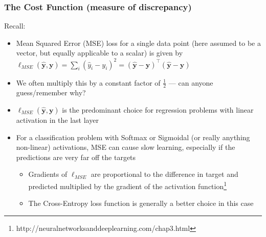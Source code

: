 \documentclass[\beamerclass]{beamer}
\begin{document}
\begin{frame}[fragile]\frametitle{The Cost Function (measure of discrepancy) }

Recall:

\begin{itemize}
\item Mean Squared Error (MSE) loss for a single data point (here assumed to be a vector, but equally applicable to a scalar) is given by \\

$\ell_{MSE}(\bm{\hat y}, \bm y) = \sum_i(\hat{y}_i - y_i)^2 = (\bm{\hat y} - \bm y)^\top (\bm{\hat y} - \bm y)$

\item<+-> We often multiply this by a constant factor of $\frac{1}{2}$ --- can anyone guess/remember why?
\item<+-> $\ell_{MSE}(\bm{\hat y}, \bm y)$ is the predominant choice for regression problems with linear activation in the last layer

\item<+-> For a classification problem with Softmax or Sigmoidal (or really anything non-linear) activations, MSE can cause slow learning, especially if the predictions are very far off the targets
\begin{itemize}
  \item Gradients of $\ell_{MSE}$ are proportional to the difference in target and predicted multiplied by the gradient of the activation function\footnote{ http://neuralnetworksanddeeplearning.com/chap3.html}
  \item The Cross-Entropy loss function is generally a better choice in this case
\end{itemize}
\end{itemize} 

\end{frame}
\end{document}
